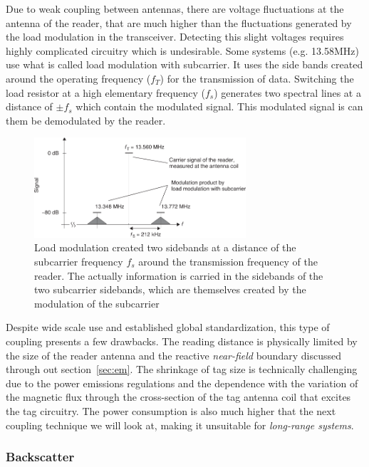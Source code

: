 Due to weak coupling between antennas, there are voltage fluctuations at the antenna of the reader, that are much higher than the fluctuations generated by the load modulation in the transceiver. Detecting this slight voltages requires highly complicated circuitry which is undesirable.
Some systems (e.g. 13.58MHz) use what is called load modulation with subcarrier. It uses the side bands created around the operating frequency ($f_T$) for the transmission of data. Switching the load resistor at a high elementary frequency ($f_s$) generates two spectral lines at a distance of $\pm f_s$ which contain the modulated signal. This modulated signal is can them be demodulated by the reader.

\begin{figure}[!ht]
    \centering
    \includegraphics[width=0.7\textwidth]{./figs/02-state-of-the-art/loadmodulation_sidebands.pdf}
    \caption{Load modulation created two sidebands at a distance of the subcarrier frequency $f_s$ around the transmission frequency of the reader. The actually information is carried in the sidebands of the two subcarrier sidebands, which are themselves created by the modulation of the subcarrier ~\cite{finkenzellerRFIDHandbookFundamentals2003}} 
    \label{fig:loadmodulationsidebands}
\end{figure}

Despite wide scale use and established global standardization, this type of coupling presents a few drawbacks. The reading distance is physically limited by the size of the reader antenna and the reactive \emph{near-field} boundary discussed through out section~\ref{sec:em}. The shrinkage of tag size is technically challenging due to the power emissions regulations and the dependence with the variation of the magnetic flux through the cross-section of the tag antenna coil that excites the tag circuitry. The power consumption is also much higher that the next coupling technique we will look at, making it unsuitable for \emph{long-range systems}.  

\subsubsection{Backscatter}

